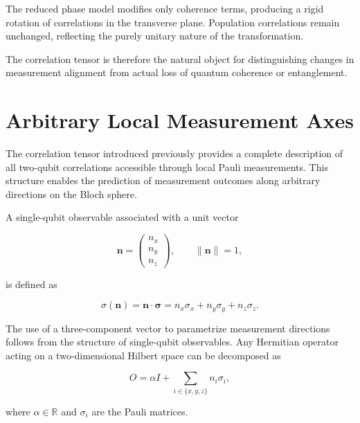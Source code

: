 The reduced phase model modifies only coherence terms, producing a rigid rotation of correlations in the transverse plane. Population correlations remain unchanged, reflecting the purely unitary nature of the transformation.

The correlation tensor is therefore the natural object for distinguishing changes in measurement alignment from actual loss of quantum coherence or entanglement.


\section{Arbitrary Local Measurement Axes}

The correlation tensor introduced previously provides a complete description of all two-qubit correlations accessible through local Pauli measurements. This structure enables the prediction of measurement outcomes along arbitrary directions on the Bloch sphere.

\medskip

A single-qubit observable associated with a unit vector

\[
\mathbf{n}
=
\begin{pmatrix}
n_x\\
n_y\\
n_z
\end{pmatrix},
\qquad
\|\mathbf{n}\| = 1,
\]

is defined as

\begin{equation}
\sigma(\mathbf{n})
=
\mathbf{n} \cdot \boldsymbol{\sigma}
=
n_x \sigma_x + n_y \sigma_y + n_z \sigma_z.
\label{eq:measurement_operator_axis}
\end{equation}

\medskip

The use of a three-component vector to parametrize measurement directions follows from the structure of single-qubit observables. Any Hermitian operator acting on a two-dimensional Hilbert space can be decomposed as

\begin{equation}
O
=
\alpha I
+
\sum_{i \in \{x,y,z\}}
n_i \sigma_i,
\label{eq:single_qubit_observable_decomposition}
\end{equation}

where \( \alpha \in \mathbb{R} \) and \( \sigma_i \) are the Pauli matrices.

